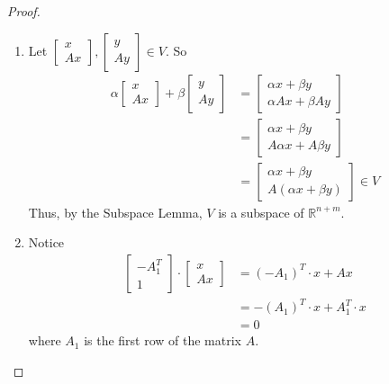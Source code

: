 \begin{exercise}
    \begin{proof}
        \begin{enumerate}
            \item Let \( \begin{bmatrix} x \\ Ax \end{bmatrix}, \begin{bmatrix} y \\ Ay \end{bmatrix} \in V \). So
            \begin{align*}
                \alpha \begin{bmatrix} x \\ Ax \end{bmatrix} + \beta \begin{bmatrix} y \\ Ay \end{bmatrix} &= \begin{bmatrix} \alpha x + \beta y \\ \alpha Ax + \beta Ay \end{bmatrix} \\
                &= \begin{bmatrix} \alpha x + \beta y \\ A\alpha x +  A \beta y \end{bmatrix} \\
                &= \begin{bmatrix} \alpha x + \beta y \\ A(\alpha x + \beta y) \end{bmatrix} \in V
            \end{align*}
            Thus, by the Subspace Lemma, \(V\) is a subspace of \(\mathbb{R}^{n+m}\).
            
            \item Notice
            \begin{align*}
                \begin{bmatrix} -A_1^T \\ 1 \end{bmatrix} \cdot \begin{bmatrix} x \\ Ax \end{bmatrix} &= (-A_1)^T \cdot x + Ax \\
                &= -(A_1)^T \cdot x + A_1^T \cdot x \\
                &= 0
            \end{align*}
            where \(A_1\) is the first row of the matrix \(A\).
        \end{enumerate}
    \end{proof}
\end{exercise} %

